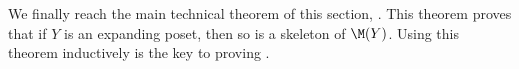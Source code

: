 %


We finally reach the main technical theorem of this section, . This theorem proves that if \(Y\) is an expanding poset, then so is a skeleton of \(\M(Y)\). Using this theorem inductively is the key to proving .

